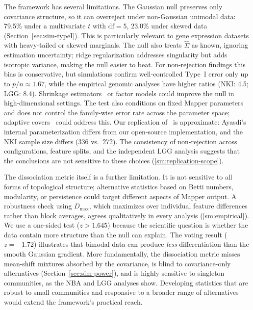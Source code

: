 \documentclass[hidelinks]{siamart251216}
\begin{document}
The framework has several limitations.  The Gaussian null preserves
only covariance structure, so it can overreject under non-Gaussian
unimodal data: 79.5\% under a multivariate $t$ with $\mathrm{df} = 5$,
23.0\% under skewed data (Section~\ref{sec:sim-typeI}).  This is
particularly relevant to gene expression datasets with heavy-tailed or
skewed marginals.  The null also treats $\hat{\Sigma}$ as known,
ignoring estimation uncertainty; ridge regularization addresses
singularity but adds isotropic variance, making the null easier to beat.
For non-rejection findings this bias is conservative, but simulations
confirm well-controlled Type~I error only up to $p/n \approx 1.67$,
while the empirical genomic analyses have higher ratios (NKI: 4.5; LGG:
8.4).  Shrinkage estimators~\citep{LedoitWolf2004} or factor models
could improve the null in high-dimensional settings.  The test also
conditions on fixed Mapper parameters and does not control the
family-wise error rate across the parameter space; adaptive
covers~\citep{Alvarado2025, Tao2025} could address this.  Our
replication of~\cite{Lum2013} is approximate: Ayasdi's internal
parameterization differs from our open-source implementation, and the
NKI sample size differs (336 vs.\ 272).  The consistency of
non-rejection across configurations, feature splits, and the independent
LGG analysis suggests that the conclusions are not sensitive to these choices
(\cref{sm:replication-scope}).

The dissociation metric itself is a further limitation.  It is not
sensitive to all forms of topological structure; alternative statistics
based on Betti numbers, modularity, or persistence could target
different aspects of Mapper output.  A robustness check using
$D_{\max}$, which maximizes over individual feature differences rather
than block averages, agrees qualitatively in every analysis
(\cref{sm:empirical}).  We use a one-sided test ($z > 1.645$) because
the scientific question is whether the data contain more structure than
the null can explain.  The voting result ($z = -1.72$) illustrates that
bimodal data can produce \emph{less} differentiation than the smooth
Gaussian gradient.  More fundamentally, the dissociation metric misses
mean-shift mixtures absorbed by the covariance, is blind to
covariance-only alternatives (Section~\ref{sec:sim-power}), and is
highly sensitive to singleton communities, as the NBA and LGG analyses
show.  Developing statistics that are robust to small communities and
responsive to a broader range of alternatives would extend the
framework's practical reach.
\end{document}

